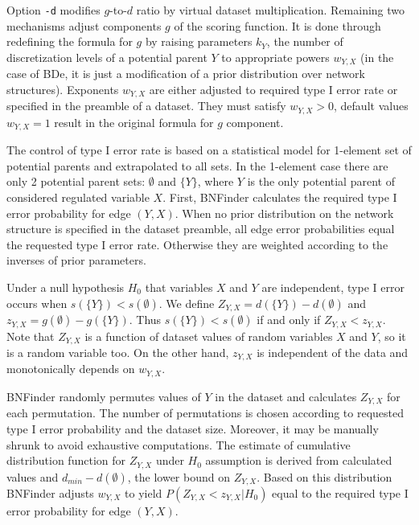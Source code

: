Option \verb$-d$ modifies $g$-to-$d$ ratio by virtual dataset multiplication.
Remaining two mechanisms adjust components $g$ of the scoring function.
It is done through redefining the formula for $g$ 
by raising parameters $k_Y$,
the number of discretization levels of a potential parent $Y$ 
to appropriate powers $w_{Y,X}$
(in the case of BDe, it is just a modification of 
a prior distribution over network structures).
Exponents $w_{Y,X}$ are either adjusted to required type I error rate 
or specified in the preamble of a dataset.
They must satisfy $w_{Y,X}>0$, default values $w_{Y,X}=1$ result 
in the original formula for $g$ component.

The control of type I error rate is based on a statistical model for 1-element
set of potential parents and extrapolated to all sets.
In the 1-element case there are only 2 potential parent sets:
$\emptyset$ and $\{Y\}$, where $Y$ is the only potential parent
of considered regulated variable $X$.
First, BNFinder calculates the required type I error probability for edge $(Y,X)$.
When no prior distribution on the network structure 
is specified in the dataset preamble,
all edge error probabilities equal the requested type I error rate.
Otherwise they are weighted according to the inverses of prior parameters.

Under a null hypothesis $H_0$ that variables $X$ and $Y$ are independent,
type I error occurs when $s(\{Y\})<s(\emptyset)$.
We define $Z_{Y,X}=d(\{Y\})-d(\emptyset)$ and $z_{Y,X}=g(\emptyset)-g(\{Y\})$.
Thus $s(\{Y\})<s(\emptyset)$ if and only if $Z_{Y,X}<z_{Y,X}$.
Note that $Z_{Y,X}$ is a function of dataset values of random variables $X$ and $Y$,
so it is a random variable too.
On the other hand, $z_{Y,X}$ is independent of the data
and monotonically depends on $w_{Y,X}$.

BNFinder randomly permutes values of $Y$ in the dataset
and calculates $Z_{Y,X}$ for each permutation.
The number of permutations is chosen according to 
requested type I error probability and the dataset size. 
Moreover, it may be manually shrunk to avoid exhaustive computations.
The estimate of
cumulative distribution function for $Z_{Y,X}$ under $H_0$ assumption
is derived from calculated values and $d_{min}-d(\emptyset)$,
the lower bound on $Z_{Y,X}$.
Based on this distribution BNFinder adjusts $w_{Y,X}$ to yield
$P(Z_{Y,X}<z_{Y,X} | H_0)$ %
equal to the required type I error probability for edge $(Y,X)$.
